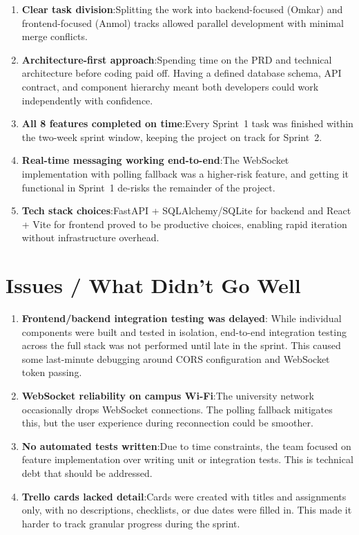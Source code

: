 \documentclass[11pt]{article}
\begin{document}
\begin{enumerate}[leftmargin=1.5em]
    \item \textbf{Clear task division}:Splitting the work into backend-focused (Omkar) and frontend-focused (Anmol) tracks allowed parallel development with minimal merge conflicts.

    \item \textbf{Architecture-first approach}:Spending time on the PRD and technical architecture before coding paid off. Having a defined database schema, API contract, and component hierarchy meant both developers could work independently with confidence.

    \item \textbf{All 8 features completed on time}:Every Sprint~1 task was finished within the two-week sprint window, keeping the project on track for Sprint~2.

    \item \textbf{Real-time messaging working end-to-end}:The WebSocket implementation with polling fallback was a higher-risk feature, and getting it functional in Sprint~1 de-risks the remainder of the project.

    \item \textbf{Tech stack choices}:FastAPI + SQLAlchemy/SQLite for backend and React + Vite for frontend proved to be productive choices, enabling rapid iteration without infrastructure overhead.
\end{enumerate}

\section{Issues / What Didn't Go Well}

\begin{enumerate}[leftmargin=1.5em]
    \item \textbf{Frontend/backend integration testing was delayed}: While individual components were built and tested in isolation, end-to-end integration testing across the full stack was not performed until late in the sprint. This caused some last-minute debugging around CORS configuration and WebSocket token passing.

    \item \textbf{WebSocket reliability on campus Wi-Fi}:The university network occasionally drops WebSocket connections. The polling fallback mitigates this, but the user experience during reconnection could be smoother.

    \item \textbf{No automated tests written}:Due to time constraints, the team focused on feature implementation over writing unit or integration tests. This is technical debt that should be addressed.

    \item \textbf{Trello cards lacked detail}:Cards were created with titles and assignments only, with no descriptions, checklists, or due dates were filled in. This made it harder to track granular progress during the sprint.
\end{enumerate}
\end{document}
